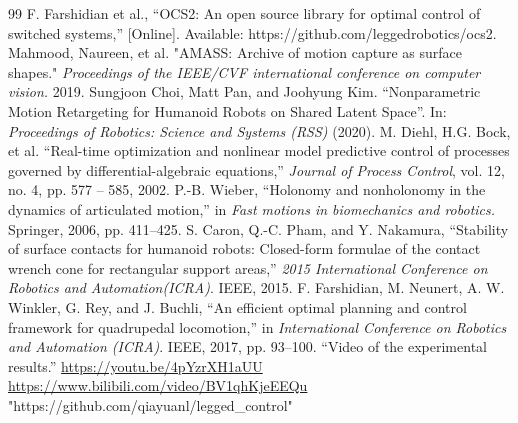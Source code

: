 \begin{thebibliography}{99}
 F. Farshidian et al., “OCS2: An open source library for optimal control of switched systems,” [Online]. Available: https://github.com/leggedrobotics/ocs2.
 Mahmood, Naureen, et al. "AMASS: Archive of motion capture as surface shapes." \textit{Proceedings of the IEEE/CVF international conference on computer vision.} 2019.
 Sungjoon Choi, Matt Pan, and Joohyung Kim. “Nonparametric Motion Retargeting for Humanoid Robots on Shared Latent Space”. In: \textit{Proceedings of Robotics: Science and Systems (RSS)} (2020).
 M. Diehl, H.G. Bock, et al. “Real-time optimization and nonlinear model predictive control of processes governed by differential-algebraic equations,” \textit{Journal of Process Control}, vol. 12, no. 4, pp. 577 – 585, 2002.
 P.-B. Wieber, “Holonomy and nonholonomy in the dynamics of articulated motion,” in \textit{Fast motions in biomechanics and robotics.} Springer, 2006, pp. 411–425.
 S. Caron, Q.-C. Pham, and Y. Nakamura, “Stability of surface contacts for humanoid robots: Closed-form formulae of the contact wrench cone for rectangular support areas,” \textit{2015 International Conference on Robotics and Automation(ICRA)}. IEEE, 2015.
 F. Farshidian, M. Neunert, A. W. Winkler, G. Rey, and J. Buchli, “An efficient optimal planning and control framework for quadrupedal locomotion,” in \textit{International Conference on Robotics and Automation (ICRA)}. IEEE, 2017, pp. 93–100.
 “Video of the experimental results.” \href{https://youtu.be/4pYzrXH1aUU}{https://youtu.be/4pYzrXH1aUU} \href{https://www.bilibili.com/video/BV1qhKjeEEQu}{https://www.bilibili.com/video/BV1qhKjeEEQu}  
 "https://github.com/qiayuanl/legged\_control"
\end{thebibliography}
